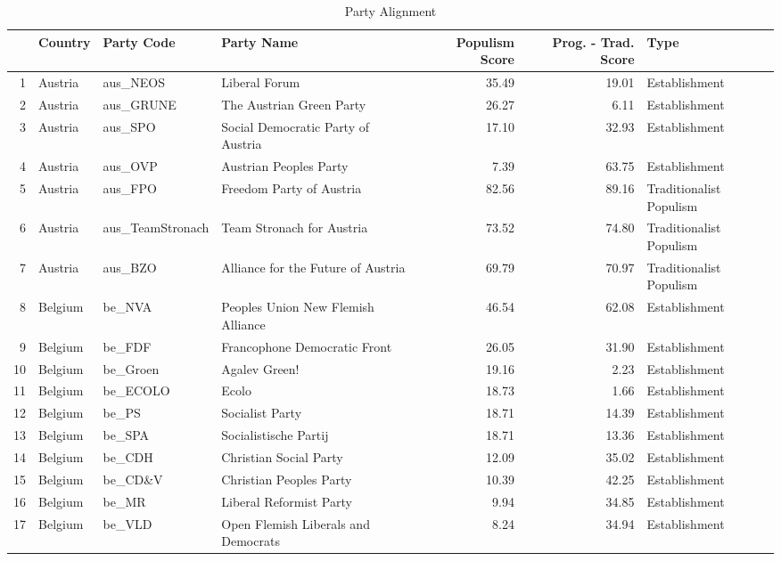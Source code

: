 \small
\begin{landscape}
\begin{longtable}[c]{@{\extracolsep{\fill}}rlllrrl}
		\caption{Party Alignment}
		\label{alignment}\\
		\hline
		& Country & Party Code & Party Name & Populism Score & Prog. - Trad. Score & Type \\ \hline
		\endhead
		\hline
		\endfoot
		\endlastfoot
		\tiny
1 & Austria & aus\_NEOS & Liberal Forum & 35.49 & 19.01 & Establishment \\ 
  2 & Austria & aus\_GRUNE & The Austrian Green Party & 26.27 & 6.11 & Establishment \\ 
  3 & Austria & aus\_SPO & Social Democratic Party of Austria & 17.10 & 32.93 & Establishment \\ 
  4 & Austria & aus\_OVP & Austrian Peoples Party & 7.39 & 63.75 & Establishment \\ 
  5 & Austria & aus\_FPO & Freedom Party of Austria & 82.56 & 89.16 & Traditionalist Populism \\ 
  6 & Austria & aus\_TeamStronach & Team Stronach for Austria & 73.52 & 74.80 & Traditionalist Populism \\ 
  7 & Austria & aus\_BZO & Alliance for the Future of Austria & 69.79 & 70.97 & Traditionalist Populism \\ 
  8 & Belgium & be\_NVA & Peoples Union New Flemish Alliance & 46.54 & 62.08 & Establishment \\ 
  9 & Belgium & be\_FDF & Francophone Democratic Front & 26.05 & 31.90 & Establishment \\ 
  10 & Belgium & be\_Groen & Agalev Green! & 19.16 & 2.23 & Establishment \\ 
  11 & Belgium & be\_ECOLO & Ecolo & 18.73 & 1.66 & Establishment \\ 
  12 & Belgium & be\_PS & Socialist Party & 18.71 & 14.39 & Establishment \\ 
  13 & Belgium & be\_SPA & Socialistische Partij & 18.71 & 13.36 & Establishment \\ 
  14 & Belgium & be\_CDH & Christian Social Party & 12.09 & 35.02 & Establishment \\ 
  15 & Belgium & be\_CD\&V & Christian Peoples Party & 10.39 & 42.25 & Establishment \\ 
  16 & Belgium & be\_MR & Liberal Reformist Party & 9.94 & 34.85 & Establishment \\ 
  17 & Belgium & be\_VLD & Open Flemish Liberals and Democrats & 8.24 & 34.94 & Establishment \\ 

\end{longtable}
\end{landscape}
